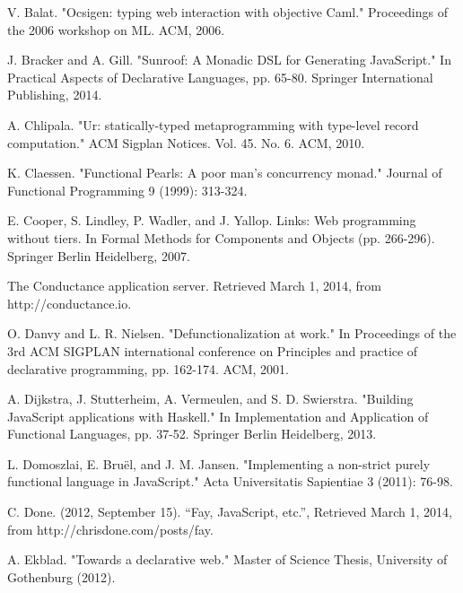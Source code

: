 \documentclass[preprint]{sigplanconf}
\begin{document}
\begin{thebibliography}{}
\softraggedright

V. Balat. "Ocsigen: typing web interaction with objective Caml." Proceedings of the 2006 workshop on ML. ACM, 2006.

J. Bracker and A. Gill. "Sunroof: A Monadic DSL for Generating JavaScript." In Practical Aspects of Declarative Languages, pp. 65-80. Springer International Publishing, 2014.

A. Chlipala. "Ur: statically-typed metaprogramming with type-level record computation." ACM Sigplan Notices. Vol. 45. No. 6. ACM, 2010.

K. Claessen. "Functional Pearls: A poor man's concurrency monad." Journal of Functional Programming 9 (1999): 313-324.

E. Cooper, S. Lindley, P. Wadler, and J. Yallop. Links: Web programming without tiers. In Formal Methods for Components and Objects (pp. 266-296). Springer Berlin Heidelberg, 2007.

The Conductance application server. Retrieved March 1, 2014, from http://conductance.io.

O. Danvy and L. R. Nielsen. "Defunctionalization at work." In Proceedings of the 3rd ACM SIGPLAN international conference on Principles and practice of declarative programming, pp. 162-174. ACM, 2001.

A. Dijkstra, J. Stutterheim, A. Vermeulen, and S. D. Swierstra. "Building JavaScript applications with Haskell." In Implementation and Application of Functional Languages, pp. 37-52. Springer Berlin Heidelberg, 2013.

L. Domoszlai, E. Bruël, and J. M. Jansen. "Implementing a non-strict purely functional language in JavaScript." Acta Universitatis Sapientiae 3 (2011): 76-98.

C. Done. (2012, September 15). ``Fay, JavaScript, etc.'', Retrieved March 1, 2014, from http://chrisdone.com/posts/fay.

A. Ekblad. "Towards a declarative web." Master of Science Thesis, University of Gothenburg (2012).


\end{thebibliography}
\end{document}
